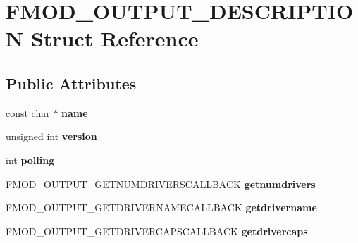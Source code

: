 \hypertarget{struct_f_m_o_d___o_u_t_p_u_t___d_e_s_c_r_i_p_t_i_o_n}{}\section{F\+M\+O\+D\+\_\+\+O\+U\+T\+P\+U\+T\+\_\+\+D\+E\+S\+C\+R\+I\+P\+T\+I\+ON Struct Reference}
\label{struct_f_m_o_d___o_u_t_p_u_t___d_e_s_c_r_i_p_t_i_o_n}
\subsection*{Public Attributes}
\begin{DoxyCompactItemize}
\item 
const char $\ast$ {\bfseries name}\hypertarget{struct_f_m_o_d___o_u_t_p_u_t___d_e_s_c_r_i_p_t_i_o_n_ab2d1c75ad80fc949101a31310f6866fe}{}\label{struct_f_m_o_d___o_u_t_p_u_t___d_e_s_c_r_i_p_t_i_o_n_ab2d1c75ad80fc949101a31310f6866fe}

\item 
unsigned int {\bfseries version}\hypertarget{struct_f_m_o_d___o_u_t_p_u_t___d_e_s_c_r_i_p_t_i_o_n_a1ffa1ceb39e6b22a0887819f479cbdd9}{}\label{struct_f_m_o_d___o_u_t_p_u_t___d_e_s_c_r_i_p_t_i_o_n_a1ffa1ceb39e6b22a0887819f479cbdd9}

\item 
int {\bfseries polling}\hypertarget{struct_f_m_o_d___o_u_t_p_u_t___d_e_s_c_r_i_p_t_i_o_n_a523fa9268311d2f39464bc0d8bdacf53}{}\label{struct_f_m_o_d___o_u_t_p_u_t___d_e_s_c_r_i_p_t_i_o_n_a523fa9268311d2f39464bc0d8bdacf53}

\item 
F\+M\+O\+D\+\_\+\+O\+U\+T\+P\+U\+T\+\_\+\+G\+E\+T\+N\+U\+M\+D\+R\+I\+V\+E\+R\+S\+C\+A\+L\+L\+B\+A\+CK {\bfseries getnumdrivers}\hypertarget{struct_f_m_o_d___o_u_t_p_u_t___d_e_s_c_r_i_p_t_i_o_n_ae5ed5731da53559226a6dc0114a67101}{}\label{struct_f_m_o_d___o_u_t_p_u_t___d_e_s_c_r_i_p_t_i_o_n_ae5ed5731da53559226a6dc0114a67101}

\item 
F\+M\+O\+D\+\_\+\+O\+U\+T\+P\+U\+T\+\_\+\+G\+E\+T\+D\+R\+I\+V\+E\+R\+N\+A\+M\+E\+C\+A\+L\+L\+B\+A\+CK {\bfseries getdrivername}\hypertarget{struct_f_m_o_d___o_u_t_p_u_t___d_e_s_c_r_i_p_t_i_o_n_ade7eeb2121ade877145b71e77c97d8ad}{}\label{struct_f_m_o_d___o_u_t_p_u_t___d_e_s_c_r_i_p_t_i_o_n_ade7eeb2121ade877145b71e77c97d8ad}

\item 
F\+M\+O\+D\+\_\+\+O\+U\+T\+P\+U\+T\+\_\+\+G\+E\+T\+D\+R\+I\+V\+E\+R\+C\+A\+P\+S\+C\+A\+L\+L\+B\+A\+CK {\bfseries getdrivercaps}\hypertarget{struct_f_m_o_d___o_u_t_p_u_t___d_e_s_c_r_i_p_t_i_o_n_a10a61f364d202bc6d4f298ef41b40fb9}{}\label{struct_f_m_o_d___o_u_t_p_u_t___d_e_s_c_r_i_p_t_i_o_n_a10a61f364d202bc6d4f298ef41b40fb9}


\end{DoxyCompactItemize}
